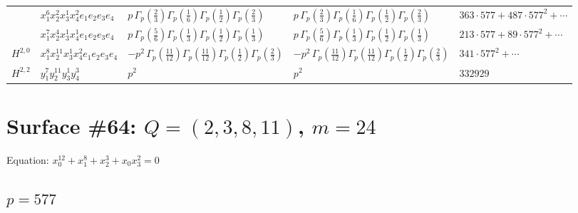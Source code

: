 \documentclass[11pt]{article}
\begin{document}
\begin{table}[ht]
{\begin{tabular}{@{}lllll@{}}
 & $x_{1}^{6} x_{2}^{2} x_{3}^{1} x_{4}^{2}  e_{1} e_{2} e_{3} e_{4}$ & $p \, \Gamma_p \left( \frac{2}{3} \right) \Gamma_p \left( \frac{1}{6} \right) \Gamma_p \left( \frac{1}{2} \right) \Gamma_p \left( \frac{2}{3} \right)$ & $p \, \Gamma_p \left( \frac{2}{3} \right) \Gamma_p \left( \frac{1}{6} \right) \Gamma_p \left( \frac{1}{2} \right) \Gamma_p \left( \frac{2}{3} \right)$ & $363{\cdot}577{+}487{\cdot}577^{2}{+}\cdots$ \\
 & $x_{1}^{7} x_{2}^{4} x_{3}^{1} x_{4}^{1}  e_{1} e_{2} e_{3} e_{4}$ & $p \, \Gamma_p \left( \frac{5}{6} \right) \Gamma_p \left( \frac{1}{3} \right) \Gamma_p \left( \frac{1}{2} \right) \Gamma_p \left( \frac{1}{3} \right)$ & $p \, \Gamma_p \left( \frac{5}{6} \right) \Gamma_p \left( \frac{1}{3} \right) \Gamma_p \left( \frac{1}{2} \right) \Gamma_p \left( \frac{1}{3} \right)$ & $213{\cdot}577{+}89{\cdot}577^{2}{+}\cdots$ \\
\midrule
$H^{2,0}$ & $x_{1}^{8} x_{2}^{11} x_{3}^{1} x_{4}^{2}  e_{1} e_{2} e_{3} e_{4}$ & $- p^{2} \, \Gamma_p \left( \frac{11}{12} \right) \Gamma_p \left( \frac{11}{12} \right) \Gamma_p \left( \frac{1}{2} \right) \Gamma_p \left( \frac{2}{3} \right)$ & $- p^{2} \, \Gamma_p \left( \frac{11}{12} \right) \Gamma_p \left( \frac{11}{12} \right) \Gamma_p \left( \frac{1}{2} \right) \Gamma_p \left( \frac{2}{3} \right)$ & $341{\cdot}577^{2}{+}\cdots$ \\
\midrule
$H^{2,2}$ & $y_{1}^{7} y_{2}^{11} y_{3}^{1} y_{4}^{3}$ & $p^{2} \,$ & $p^{2} \,$ & $332929$ \\
\bottomrule
\end{tabular}
}
\renewcommand{\arraystretch}{1.0}
\end{table}

\newpage

\section*{Surface \#64: $Q=(2, 3, 8, 11)$, $m=24$}

Equation: $x_0^{12} + x_1^{8} + x_2^{3} + x_0 x_3^{2} = 0$

\subsection*{$p = 577$}
\end{document}
